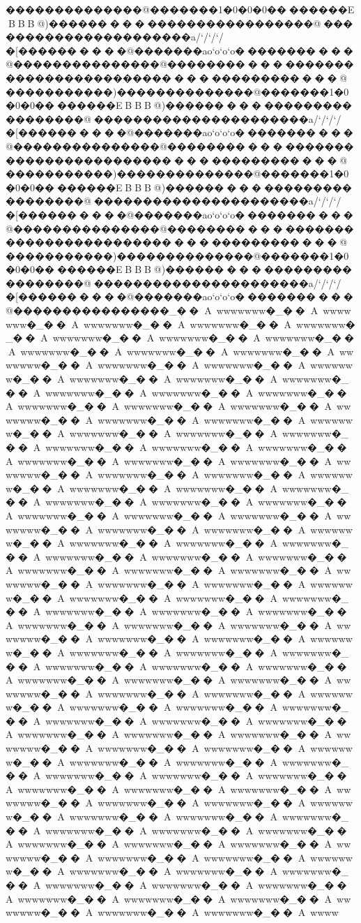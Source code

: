 {{{{{{{{{{{{{{{{{{{{{{{{{{{{{{{{{{{{{{{{{{{{{{{{{{{{{{{{{{{{{{{{{{{{{{{{{{{{{{{{��������������@�������1�0�0�0��������EBBB@)��������������������������@����������������������a/`/`/`/�[����������@�������ao`o`o`o�����������@���������������@��������������������������������������������������@������� � � � �)��������������@�������1�0�0�0��������EBBB@)��������������������������@����������������������a/`/`/`/�[����������@�������ao`o`o`o�����������@���������������@��������������������������������������������������@������� � � � �)��������������@�������1�0�0�0��������EBBB@)��������������������������@����������������������a/`/`/`/�[����������@�������ao`o`o`o�����������@���������������@��������������������������������������������������@������� � � � �)��������������@�������1�0�0�0��������EBBB@)��������������������������@����������������������a/`/`/`/�[����������@�������ao`o`o`o�����������@����������������_��A~wwwwwww�_��A~wwwwwww�_��A~wwwwwww�_��A~wwwwwww�_��A~wwwwwww�_��A~wwwwwww�_��A~wwwwwww�_��A~wwwwwww�_��A~wwwwwww�_��A~wwwwwww�_��A~wwwwwww�_��A~wwwwwww�_��A~wwwwwww�_��A~wwwwwww�_��A~wwwwwww�_��A~wwwwwww�_��A~wwwwwww�_��A~wwwwwww�_��A~wwwwwww�_��A~wwwwwww�_��A~wwwwwww�_��A~wwwwwww�_��A~wwwwwww�_��A~wwwwwww�_��A~wwwwwww�_��A~wwwwwww�_��A~wwwwwww�_��A~wwwwwww�_��A~wwwwwww�_��A~wwwwwww�_��A~wwwwwww�_��A~wwwwwww�_��A~wwwwwww�_��A~wwwwwww�_��A~wwwwwww�_��A~wwwwwww�_��A~wwwwwww�_��A~wwwwwww�_��A~wwwwwww�_��A~wwwwwww�_��A~wwwwwww�_��A~wwwwwww�_��A~wwwwwww�_��A~wwwwwww�_��A~wwwwwww�_��A~wwwwwww�_��A~wwwwwww�_��A~wwwwwww�_��A~wwwwwww�_��A~wwwwwww�_��A~wwwwwww�_��A~wwwwwww�_��A~wwwwwww�_��A~wwwwwww�_��A~wwwwwww�_��A~wwwwwww�_��A~wwwwwww�_��A~wwwwwww�_��A~wwwwwww�_��A~wwwwwww�_��A~wwwwwww�_��A~wwwwwww�_��A~wwwwwww�_��A~wwwwwww�_��A~wwwwwww�_��A~wwwwwww�_��A~wwwwwww�_��A~wwwwwww�_��A~wwwwwww�_��A~wwwwwww�_��A~wwwwwww�_��A~wwwwwww�_��A~wwwwwww�_��A~wwwwwww�_��A~wwwwwww�_��A~wwwwwww�_��A~wwwwwww�_��A~wwwwwww�_��A~wwwwwww�_��A~wwwwwww�_��A~wwwwwww�_��A~wwwwwww�_��A~wwwwwww�_��A~wwwwwww�_��A~wwwwwww�_��A~wwwwwww�_��A~wwwwwww�_��A~wwwwwww�_��A~wwwwwww�_��A~wwwwwww�_��A~wwwwwww�_��A~wwwwwww�_��A~wwwwwww�_��A~wwwwwww�_��A~wwwwwww�_��A~wwwwwww�_��A~wwwwwww�_��A~wwwwwww�_��A~wwwwwww�_��A~wwwwwww�_��A~wwwwwww�_��A~wwwwwww�_��A~wwwwwww�_��A~wwwwwww�_��A~wwwwwww�_��A~wwwwwww�_��A~wwwwwww�_��A~wwwwwww�_��A~wwwwwww�_��A~wwwwwww�_��A~wwwwwww�_��A~wwwwwww�_��A~wwwwwww�_��A~wwwwwww�_��A~wwwwwww�_��A~wwwwwww�_��A~wwwwwww�_��A~wwwwwww�_��A~wwwwwww�_��A~wwwwwww�_��A~wwwwwww�_��A~wwwwwww�_��A~wwwwwww�_��A~wwwwwww�_��A~wwwwwww�_��A~wwwwwww�_��A~wwwwwww�_��A~wwwwwww�_��A~wwwwwww�_��A~wwwwwww�_��A~wwwwwww�_��A~wwwwwww�_��A~wwwwwww�_��A~wwwwwww�_��A~wwwwwww�_��A~wwwwwww�_��A~wwwwwww�_��A~wwwwwww�_��A~wwwwwww�_��A~wwwwwww�_��A~wwwwwww�_��A~wwwwwww�_��A~wwwwwww�_��A~wwwwwww�_��A~wwww}}}}}}}}}}}}}}}}}}}}}}}}}}}}}}}}}}}}}}}}}}}}}}}}}}}}}}}}}}}}}}}}}}}}}}}}}}}}}}}}
